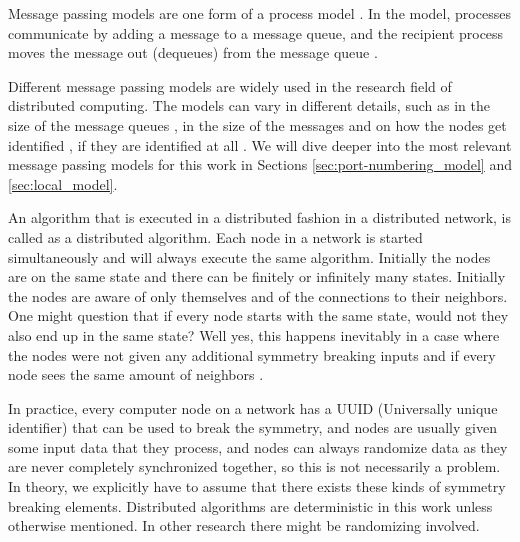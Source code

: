 Message passing models are one form of a process model \cite{DBLP:books/el/leeuwen90/LamportL90}.
In the model, processes communicate by adding a message to a message queue, and the recipient process moves the message out (dequeues) from the message queue \cite{DBLP:books/el/leeuwen90/LamportL90}.

Different message passing models are widely used in the research field of distributed computing.
The models can vary in different details, such as in the size of the message queues \cite{DBLP:books/el/leeuwen90/LamportL90}, in the size of the messages \cite{peleg2000distributed} and on how the nodes get identified \cite{DBLP:conf/focs/Linial87}, if they are identified at all \cite{DBLP:conf/istcs/MayerNS95}.
We will dive deeper into the most relevant message passing models for this work in Sections \ref{sec:port-numbering_model} and \ref{sec:local_model}.

An algorithm that is executed in a distributed fashion in a distributed network, is called as a distributed algorithm.
Each node in a network is started simultaneously and will always execute the same algorithm.
Initially the nodes are on the same state and there can be finitely or infinitely many states.
Initially the nodes are aware of only themselves and of the connections to their neighbors.
One might question that if every node starts with the same state, would not they also end up in the same state?
Well yes, this happens inevitably in a case where the nodes were not given any additional symmetry breaking inputs and if every node sees the same amount of neighbors \cite{HirvonenSuomelaDistAlg2020}.



In practice, every computer node on a network has a UUID (Universally unique identifier) that can be used to break the symmetry, and nodes are usually given some input data that they process, and nodes can always randomize data as they are never completely synchronized together, so this is not necessarily a problem.
In theory, we explicitly have to assume that there exists these kinds of symmetry breaking elements.
Distributed algorithms are deterministic in this work unless otherwise mentioned.
In other research there might be randomizing involved.


